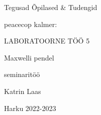 \begin{titlepage}
\par{Tegusad Õpilased \& Tudengid}
\vspace{0.3\textheight}
\par{peacecop kalmer:}
\LARGE
\par{LABORATOORNE TÖÖ 5}
\par{Maxwelli pendel}
\normalsize
\par{seminaritöö}
\vspace{0.3\textheight}
\begin{flushright}
\par{Katrin Laas}
\end{flushright}
\vfill
Harku
\hfill
2022-2023
\end{titlepage}

